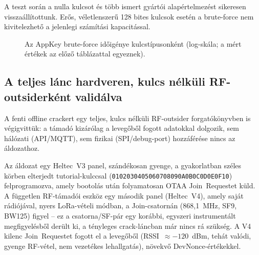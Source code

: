 \documentclass[12pt,a4paper]{article}
\begin{document}
A teszt során a nulla kulcsot és több ismert gyártói alapértelmezést sikeresen
visszaállítottunk. Erős, véletlenszerű 128 bites kulcsok esetén a brute-force
nem kivitelezhető a jelenlegi számítási kapacitással.

\begin{figure}[H]
\centering
{}
\caption{Az AppKey brute-force időigénye kulcstípusonként (log-skála; a
mért értékek az előző táblázattal egyeznek).}
\end{figure}

\subsection{A teljes lánc hardveren, kulcs nélküli RF-outsiderként validálva}

A fenti offline crackert egy teljes, kulcs nélküli RF-outsider forgatókönyvben
is végigvittük: a támadó kizárólag a levegőből fogott adatokkal dolgozik,
sem hálózati (API/MQTT), sem fizikai (SPI/debug-port) hozzáférése nincs az
áldozathoz.

Az áldozat egy Heltec~V3 panel, szándékosan gyenge, a gyakorlatban széles
körben elterjedt tutorial-kulccsal
(\texttt{0102030405060708090A0B0C0D0E0F10}) felprogramozva, amely bootolás
után folyamatosan OTAA Join~Requestet küld. A független RF-támadói
eszköz egy második panel (Heltec~V4), amely saját rádiójával, nyers
LoRa-vételi módban, a Join-csatornán (868,1~MHz, SF9, BW125) figyel -- ez
a csatorna/SF-pár egy korábbi, egyszeri instrumentált megfigyelésből derült
ki, a tényleges crack-láncban már nincs rá szükség. A V4 kilenc Join~Requestet
fogott el a levegőből (RSSI~$\approx-120$~dBm, tehát valódi, gyenge RF-vétel,
nem vezetékes lehallgatás), növekvő DevNonce-értékekkel.
\end{document}
